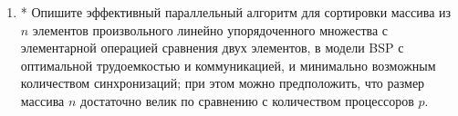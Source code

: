 \documentclass[11pt]{article}
\newenvironment{exercise}{\item}{}
\begin{document}
\begin{enumerate}
\begin{exercise}*
Опишите эффективный параллельный алгоритм для сортировки массива из $n$ элементов 
произвольного линейно упорядоченного множества
с элементарной операцией сравнения двух элементов,
в модели BSP с оптимальной трудоемкостью и коммуникацией, 
и минимально возможным количеством синхронизаций;
при этом можно предположить, что размер массива $n$ достаточно велик 
по сравнению с количеством процессоров $p$.
\end{exercise}

\end{enumerate}
\end{document}
